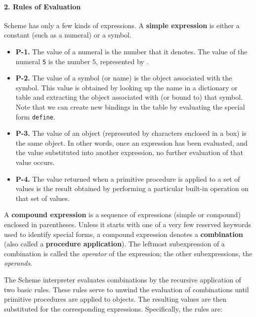 \paragraph{2. Rules of Evaluation} 

Scheme has only a few kinds of expressions.  A {\bf simple expression}
is either a constant (such as a numeral) or a symbol.

\begin{itemize} 
\item{\bf P-1.}  The value of a numeral is the number that it denotes.
The value of the numeral {\tt 5} is the number $5$, represented by .

\item{\bf P-2.} The value of a symbol (or name) is the object associated
with the symbol. This value is obtained by looking up the name in a
dictionary or table and extracting the object associated with (or
bound to) that symbol. Note that we can create new bindings in the
table by evaluating the special form {\tt define}.

\item{\bf P-3.}  The value of an object (represented by characters enclosed
in a box) is the same object. In other words, once an expression has
been evaluated, and the value substituted into another expression, no
further evaluation of that value occurs.

\item{\bf P-4.} The value returned when a primitive procedure 
is applied to a set of values is the result obtained by performing
a particular built-in operation on that set of values.
\end{itemize}

A {\bf compound expression} is a sequence of expressions (simple or
compound) enclosed in parentheses. Unless it starts with one of a
very few reserved keywords used to identify special forms, a compound
expression denotes a {\bf combination} (also called a {\bf procedure
application}). The leftmost subexpression of a combination is called the
{\it operator} of the expression; the other subexpressions, the
{\it operands}. 

The Scheme interpreter evaluates combinations by the recursive
application of two basic rules. These rules serve to unwind the
evaluation of combinations until primitive procedures are applied to
objects. The resulting values are then substituted for the
corresponding expressions. Specifically, the rules are:

